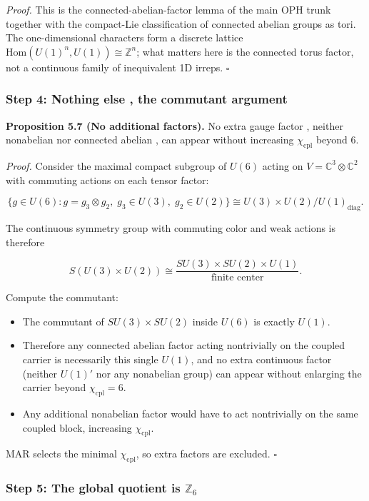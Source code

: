 \emph{Proof.} This is the connected-abelian-factor lemma of the main OPH trunk together with the compact-Lie classification of connected abelian groups as tori. The one-dimensional characters form a discrete lattice \(\mathrm{Hom}(U(1)^n,U(1)) \cong \mathbb{Z}^n\); what matters here is the connected torus factor, not a continuous family of inequivalent 1D irreps. \(\square\)

\subsubsection{Step 4: Nothing else , the commutant argument}\label{step-4-nothing-else--the-commutant-argument}

\textbf{Proposition 5.7 (No additional factors).} No extra gauge factor , neither nonabelian nor connected abelian , can appear without increasing \(\chi_{\mathrm{cpl}}\) beyond 6.

\emph{Proof.} Consider the maximal compact subgroup of \(U(6)\) acting on \(V = \mathbb{C}^3 \otimes \mathbb{C}^2\) with commuting actions on each tensor factor:

\[\{g \in U(6) : g = g_3 \otimes g_2,\; g_3 \in U(3),\; g_2 \in U(2)\} \cong U(3) \times U(2) / U(1)_{\mathrm{diag}}.\]

The continuous symmetry group with commuting color and weak actions is therefore

\[S(U(3) \times U(2)) \cong \frac{SU(3) \times SU(2) \times U(1)}{\text{finite center}}.\]

Compute the commutant:

\begin{itemize}
\tightlist
\item
  The commutant of \(SU(3) \times SU(2)\) inside \(U(6)\) is exactly \(U(1)\).
\item
  Therefore any connected abelian factor acting nontrivially on the coupled carrier is necessarily this single \(U(1)\), and no extra continuous factor (neither \(U(1)'\) nor any nonabelian group) can appear without enlarging the carrier beyond \(\chi_{\mathrm{cpl}} = 6\).
\item
  Any additional nonabelian factor would have to act nontrivially on the same coupled block, increasing \(\chi_{\mathrm{cpl}}\).
\end{itemize}

MAR selects the minimal \(\chi_{\mathrm{cpl}}\), so extra factors are excluded. \(\square\)

\subsubsection{\texorpdfstring{Step 5: The global quotient is \(\mathbb{Z}_6\)}{Step 5: The global quotient is \textbackslash mathbb\{Z\}\_6}}\label{step-5-the-global-quotient-is-mathbbz_6}

